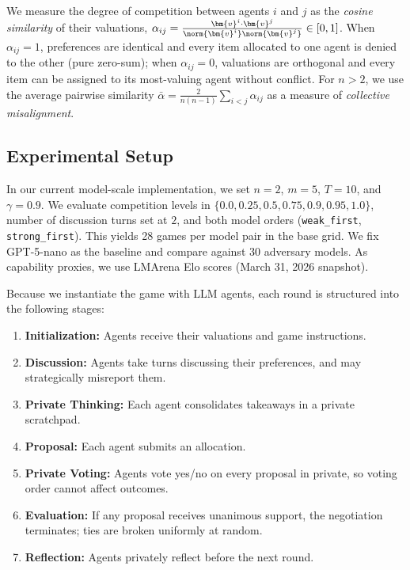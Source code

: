 We measure the degree of competition between agents $i$ and $j$ as the \emph{cosine similarity} of their valuations, $\alpha_{ij} = \frac{{\bm{v}^i} \cdot \bm{v}^j}{\norm{\bm{v}^i} \norm{\bm{v}^j}} \in [0,1]$.
When $\alpha_{ij} = 1$, preferences are identical and every item allocated to one agent is denied to the other (pure zero-sum); when $\alpha_{ij} = 0$, valuations are orthogonal and every item can be assigned to its most-valuing agent without conflict.
For $n > 2$, we use the average pairwise similarity $\bar{\alpha} = \frac{2}{n(n-1)} \sum_{i < j} \alpha_{ij}$ as a measure of \emph{collective misalignment}.

\subsection{Experimental Setup}
\label{sec:game_1_experimental_setup}

In our current model-scale implementation, we set $n = 2$, $m = 5$, $T = 10$, and $\gamma = 0.9$.
We evaluate competition levels in $\{0.0, 0.25, 0.5, 0.75, 0.9, 0.95, 1.0\}$, number of discussion turns set at $2$, and both model orders (\texttt{weak\_first}, \texttt{strong\_first}). This yields 28 games per model pair in the base grid.
We fix GPT-5-nano as the baseline and compare against 30 adversary models.
As capability proxies, we use LMArena Elo scores \citep{chiang2024chatbotarenaopenplatform} (March 31, 2026 snapshot).

Because we instantiate the game with LLM agents, each round is structured into the following stages:

\begin{enumerate}
    \item \textbf{Initialization:} Agents receive their valuations and game instructions.
    \item \textbf{Discussion:} Agents take turns discussing their preferences, and may strategically misreport them.
    \item \textbf{Private Thinking:} Each agent consolidates takeaways in a private scratchpad.
    \item \textbf{Proposal:} Each agent submits an allocation.
    \item \textbf{Private Voting:} Agents vote yes/no on every proposal in private, so voting order cannot affect outcomes.
    \item \textbf{Evaluation:} If any proposal receives unanimous support, the negotiation terminates; ties are broken uniformly at random.
    \item \textbf{Reflection:} Agents privately reflect before the next round.
\end{enumerate}

